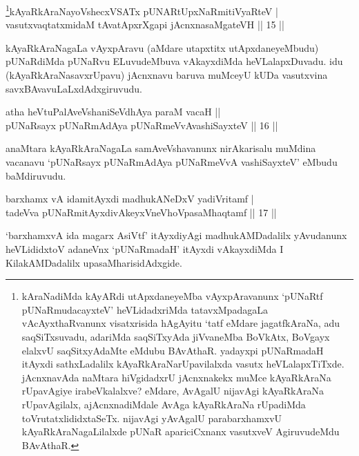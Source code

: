 

\begin{shl}
\footnote{kAraNadiMda kAyARdi utApxdaneyeMba vAyxpAravanunx `pUNaRtf pUNaRmudacayxteV' heVLidadxriMda tatavxMpadagaLa vAcAyxthaRvanunx visatxrisida hAgAyitu `tatf eMdare jagatfkAraNa, adu saqSiTxsuvadu, adariMda saqSiTxyAda jiVvaneMba BoVkAtx, BoVgayx elalxvU saqSitxyAdaMte eMdubu BAvAthaR. yadayxpi pUNaRmadaH itAyxdi sathxLadalilx kAyaRkAraNarUpavilalxda vasutx heVLalapxTiTxde. jAcnxnavAda naMtara hiVgidadxrU jAcnxnakekx muMce kAyaRkAraNa rUpavAgiye irabeVkalalxve? eMdare, AvAgalU nijavAgi kAyaRkAraNa rUpavAgilalx, ajAcnxnadiMdale AvAga kAyaRkAraNa rUpadiMda toVrutatxlididxtaSeTx. nijavAgi yAvAgalU parabarxhamxvU kAyaRkAraNagaLilalxde pUNaR apariciCxnanx vasutxveV AgiruvudeMdu BAvAthaR.}kAyaRkAraNayoVshecxVSATx pUNARtUpxNaRmitiVyaRteV  | \\
vasutxvaqtatxmidaM tAvatApxrXgapi jAcnxnasaMgateVH \hfill ||  15 ||  
\end{shl}

\begin{artha}
kAyaRkAraNagaLa vAyxpAravu (aMdare utapxtitx utApxdaneyeMbudu) pUNaRdiMda pUNaRvu ELuvudeMbuva vAkayxdiMda heVLalapxDuvadu. idu (kAyaRkAraNasavxrUpavu) jAcnxnavu baruva muMceyU kUDa vasutxvina savxBAvavuLaLxdAdxgiruvudu.
\end{artha}


\begin{shl}
atha heVtuPalAveVshaniSeVdhAya paraM vacaH ||  \\
pUNaRsayx pUNaRmAdAya pUNaRmeVvAvashiSayxteV \hfill||  16 ||  
\end{shl}

\begin{artha}
anaMtara kAyaRkAraNagaLa samAveVshavanunx nirAkarisalu muMdina vacanavu `pUNaRsayx pUNaRmAdAya pUNaRmeVvA vashiSayxteV' eMbudu baMdiruvudu.
\end{artha}

\begin{shl}
barxhamx vA idamitAyxdi madhukANeDxV yadiVritamf  | \\
tadeVva pUNaRmitAyxdivAkeyxVneVhoVpasaMhaqtamf \hfill ||  17 ||  
\end{shl}

\begin{artha}
`barxhamxvA ida magarx AsiVtf' itAyxdiyAgi madhukAMDadalilx yAvudanunx heVLididxtoV adaneVnx `pUNaRmadaH' itAyxdi vAkayxdiMda I KilakAMDadalilx upasaMharisidAdxgide.
\end{artha}

